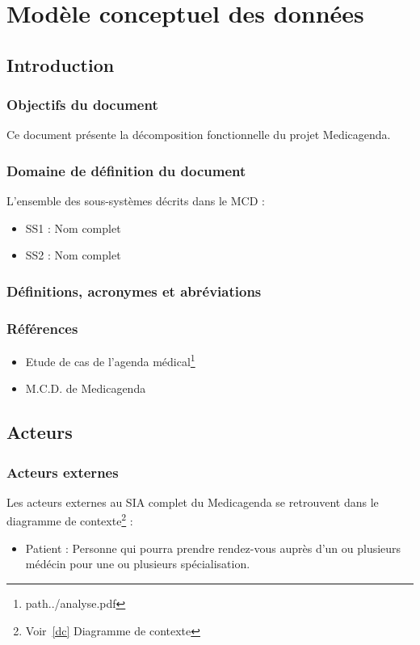 \documentclass[a4paper, 11pt]{report}
\begin{document}

\tableofcontents

\chapter{Modèle conceptuel des données}

\section{Introduction}

\subsection{Objectifs du document}
Ce document présente la décomposition fonctionnelle du projet Medicagenda.
\subsection{Domaine de définition du document}
L'ensemble des sous-systèmes décrits dans le MCD :
\begin{itemize}
	\item SS1 : Nom complet
	\item SS2 : Nom complet 
\end{itemize}
\subsection{Définitions, acronymes et abréviations}
\subsection{Références}
\begin{itemize}
	\item[] Etude de cas de l'agenda médical\footnote{path{../analyse.pdf}}
	\item[] M.C.D. de Medicagenda
\end{itemize}
\newpage
\section{Acteurs}
\subsection{Acteurs externes}
Les acteurs externes au SIA complet du Medicagenda se retrouvent dans le 
diagramme de contexte\footnote{Voir~\ref{dc} Diagramme de contexte} : 
\begin{itemize}
	\item Patient : Personne qui pourra prendre rendez-vous auprès d'un ou
		plusieurs médécin pour une ou plusieurs spécialisation.
\end{itemize}
\end{document}
